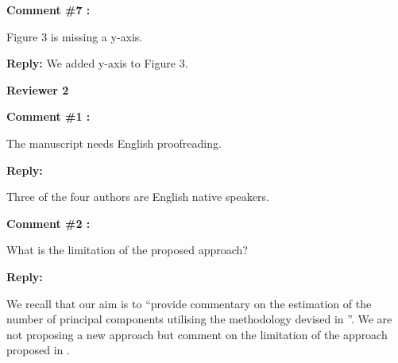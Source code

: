 \documentclass[11pt]{article}
\begin{document}
\bigskip


\itshape

\itshape

\textbf{Comment \#7 :}

Figure 3 is missing a y-axis.

\medskip

\normalfont

\textbf{Reply:} We added y-axis to Figure 3.



\bigskip




{\large \textbf{Reviewer 2} }


\bigskip

\itshape


\textbf{Comment \#1 :}

The manuscript needs English proofreading.

\medskip

\normalfont

\textbf{Reply:} 

Three of the four authors are English native speakers. 

\bigskip

\itshape

\textbf{Comment \#2 :}

What is the limitation of the proposed approach?

\medskip

\normalfont

\textbf{Reply:} 

We recall that our aim is to ``provide commentary on the estimation of the number of principal components utilising the methodology devised in \cite{happMultivariateFunctionalPrincipal2018}''. We are not proposing a new approach but comment on the limitation of the approach proposed in \cite{happMultivariateFunctionalPrincipal2018}.

\bigskip



 
\end{document}
